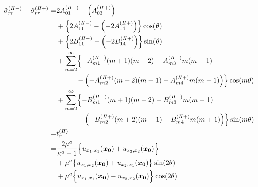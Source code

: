 \begin{align}
	\hat{\sigma}_{rr}^{(I\hspace{-.15em}I-)}-\hat{\sigma}_{rr}^{(I\hspace{-.15em}I+)} =
	&2A_{01}^{(I\hspace{-.15em}I-)}-\Bigl(A_{03}^{(I\hspace{-.15em}I+)}\Bigr)
	\nonumber
	\\
	&+\Bigl\{2A_{11}^{(I\hspace{-.15em}I-)}
	-\Bigl(-2A_{14}^{(I\hspace{-.15em}I+)}\Bigr)\Bigr\}\cos(\theta)
	\nonumber
	\\
	&+\Bigl\{2B_{11}^{(I\hspace{-.15em}I-)}
	-\Bigl(-2B_{14}^{(I\hspace{-.15em}I+)}\Bigr)\Bigr\}\sin(\theta)
	\nonumber
	\\
	&+\sum_{m=2}^{\infty}\Bigl\{
	-A_{m1}^{(I\hspace{-.15em}I-)}(m+1)(m-2)-A_{m3}^{(I\hspace{-.15em}I-)}m(m-1)
	\nonumber
	\\
	&\hspace{1.0cm}-\Bigl(-A_{m2}^{(I\hspace{-.15em}I+)}(m+2)(m-1)-A_{m4}^{(I\hspace{-.15em}I+)}m(m+1)\Bigr)
	\Bigr\}\cos(m\theta)
	\nonumber
	\\
	&+\sum_{m=2}^{\infty}\Bigl\{
	-B_{m1}^{(I\hspace{-.15em}I-)}(m+1)(m-2)-B_{m3}^{(I\hspace{-.15em}I-)}m(m-1)
	\nonumber
	\\
	&\hspace{1.0cm}-\Bigl(-B_{m2}^{(I\hspace{-.15em}I+)}(m+2)(m-1)-B_{m4}^{(I\hspace{-.15em}I+)}m(m+1)\Bigr)
	\Bigr\}\sin(m\theta)
	\nonumber
	\\
	=&t_{r}^{(I\hspace{-.15em}I)}
	\nonumber
	\\
		=&\frac{2\mu^a}{\kappa^a-1}\Bigl\{ u_{x_{1},x_{1}}(\bm{x_{0}})
			+ u_{x_{2},x_{2}}(\bm{x_{0}})\Bigr\}
			\nonumber
			\\
			&+\mu^a\bigl\{u_{x_{1},x_{2}}(\bm{x_{0}})
			+u_{x_{2},x_{1}}(\bm{x_{0}})\bigr\}\sin(2\theta)
			\nonumber
			\\
			&+\mu^a\Bigl\{ u_{x_{1},x_{1}}(\bm{x_{0}})
			- u_{x_{2},x_{2}}(\bm{x_{0}})\Bigr\}\cos(2\theta)
	\label{eq:SigmaRR2eq}
\end{align}

